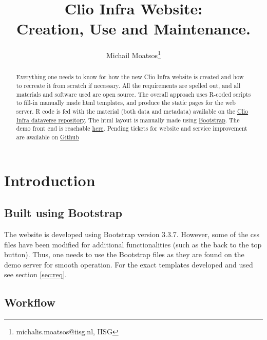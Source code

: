 \documentclass[a4paper]{article}
\title{Clio Infra Website:\\ Creation, Use and Maintenance.}
\author{Michail Moatsos\footnote{michalis.moatsos@iisg.nl, IISG}}
\begin{document}
\maketitle 
\begin{abstract}
Everything one needs to know for how the new Clio Infra website is created and 
how to recreate it from scratch if necessary. All the requirements are spelled 
out, and all materials and software used are open source. The overall approach 
uses R-coded scripts to fill-in manually made html templates, and produce the 
static pages for the web server. R code is fed with the material (both data and 
metadata) available on the 
\href{https://datasets.socialhistory.org/dataverse/clioinfra}{Clio Infra 
dataverse repository}. The html layout is manually made using 
\href{http://getbootstrap.com/}{Bootstrap}. The demo front end is reachable 
\href{clio2.sandbox.socialhistoryservices.org}{here}. Pending tickets for 
website and service improvement are available on 
\href{https://github.com/CLARIAH/wp4-requirements}{Github}
\end{abstract}

\clearpage

\tableofcontents

\clearpage

\section{Introduction}\label{sec:intro}



\subsection{Built using Bootstrap}

The website is developed using Bootstrap version 3.3.7. However, some of the 
css files have been modified for additional functionalities (such as the back 
to the top button). Thus, one needs to use the Bootstrap files as they are 
found on the demo server for smooth operation. For the exact templates 
developed and used see section \ref{sec:req}.

\subsection{Workflow}
\end{document}
